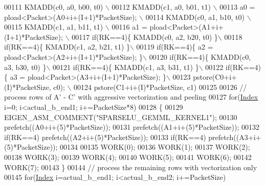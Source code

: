 \begin{DoxyCode}
00111 \textcolor{preprocessor}{                     KMADD(c0, a0, b00, t0)                      \(\backslash\)}
00112 \textcolor{preprocessor}{                     KMADD(c1, a0, b01, t1)                      \(\backslash\)}
00113 \textcolor{preprocessor}{                     a0 = pload<Packet>(A0+i+(I+1)*PacketSize);  \(\backslash\)}
00114 \textcolor{preprocessor}{                     KMADD(c0, a1, b10, t0)                      \(\backslash\)}
00115 \textcolor{preprocessor}{                     KMADD(c1, a1, b11, t1)                      \(\backslash\)}
00116 \textcolor{preprocessor}{                     a1 = pload<Packet>(A1+i+(I+1)*PacketSize);  \(\backslash\)}
00117 \textcolor{preprocessor}{          if(RK==4)\{ KMADD(c0, a2, b20, t0)                     \}\(\backslash\)}
00118 \textcolor{preprocessor}{          if(RK==4)\{ KMADD(c1, a2, b21, t1)                     \}\(\backslash\)}
00119 \textcolor{preprocessor}{          if(RK==4)\{ a2 = pload<Packet>(A2+i+(I+1)*PacketSize); \}\(\backslash\)}
00120 \textcolor{preprocessor}{          if(RK==4)\{ KMADD(c0, a3, b30, t0)                     \}\(\backslash\)}
00121 \textcolor{preprocessor}{          if(RK==4)\{ KMADD(c1, a3, b31, t1)                     \}\(\backslash\)}
00122 \textcolor{preprocessor}{          if(RK==4)\{ a3 = pload<Packet>(A3+i+(I+1)*PacketSize); \}\(\backslash\)}
00123 \textcolor{preprocessor}{                     pstore(C0+i+(I)*PacketSize, c0);            \(\backslash\)}
00124 \textcolor{preprocessor}{                     pstore(C1+i+(I)*PacketSize, c1)}
00125         
00126         \textcolor{comment}{// process rows of A' - C' with aggressive vectorization and peeling }
00127         \textcolor{keywordflow}{for}(\hyperlink{namespace_eigen_a62e77e0933482dafde8fe197d9a2cfde}{Index} i=0; i<actual\_b\_end1; i+=PacketSize*8)
00128         \{
00129           EIGEN\_ASM\_COMMENT(\textcolor{stringliteral}{"SPARSELU\_GEMML\_KERNEL1"});
00130                     prefetch((A0+i+(5)*PacketSize));
00131                     prefetch((A1+i+(5)*PacketSize));
00132           \textcolor{keywordflow}{if}(RK==4) prefetch((A2+i+(5)*PacketSize));
00133           \textcolor{keywordflow}{if}(RK==4) prefetch((A3+i+(5)*PacketSize));
00134 
00135           WORK(0);
00136           WORK(1);
00137           WORK(2);
00138           WORK(3);
00139           WORK(4);
00140           WORK(5);
00141           WORK(6);
00142           WORK(7);
00143         \}
00144         \textcolor{comment}{// process the remaining rows with vectorization only}
00145         \textcolor{keywordflow}{for}(\hyperlink{namespace_eigen_a62e77e0933482dafde8fe197d9a2cfde}{Index} i=actual\_b\_end1; i<actual\_b\_end2; i+=PacketSize)

\end{DoxyCode}
